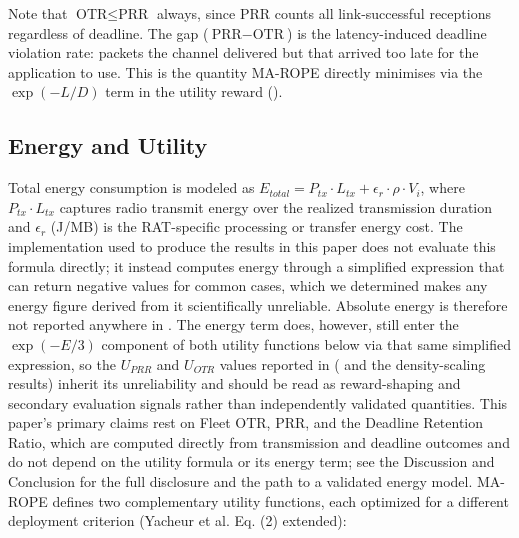 \documentclass[journal,10pt,twocolumn]{IEEEtran}
\begin{document}
Note that $\text{OTR} \leq \text{PRR}$ always, since PRR counts all link-successful receptions regardless of deadline. The gap ($\text{PRR} - \text{OTR}$) is the latency-induced deadline violation rate: packets the channel delivered but that arrived too late for the application to use. This is the quantity MA-ROPE directly minimises via the $\exp(-L/D)$ term in the utility reward ().

\subsection{Energy and Utility}

Total energy consumption is modeled as $E_{total} = P_{tx} \cdot L_{tx} + \epsilon_r \cdot \rho \cdot V_i$, where $P_{tx} \cdot L_{tx}$ captures radio transmit energy over the realized transmission duration and $\epsilon_r$ (J/MB) is the RAT-specific processing or transfer energy cost. The implementation used to produce the results in this paper does not evaluate this formula directly; it instead computes energy through a simplified expression that can return negative values for common cases, which we determined makes any energy figure derived from it scientifically unreliable. Absolute energy is therefore not reported anywhere in . The energy term does, however, still enter the $\exp(-E/3)$ component of both utility functions below via that same simplified expression, so the $U_{PRR}$ and $U_{OTR}$ values reported in  ( and the density-scaling results) inherit its unreliability and should be read as reward-shaping and secondary evaluation signals rather than independently validated quantities. This paper's primary claims rest on Fleet OTR, PRR, and the Deadline Retention Ratio, which are computed directly from transmission and deadline outcomes and do not depend on the utility formula or its energy term; see the Discussion and Conclusion for the full disclosure and the path to a validated energy model. MA-ROPE defines two complementary utility functions, each optimized for a different deployment criterion (Yacheur et al. \cite{yacheur2023} Eq. (2) extended):
\end{document}
